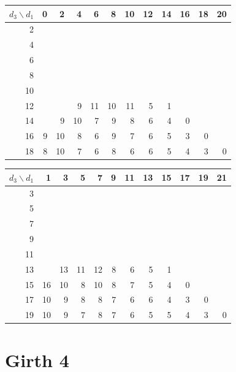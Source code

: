 \begin{tabular}{r|rrrrrrrrrrr}
\hline
$d_3 \backslash d_1$ & 0 & 2 & 4 & 6 & 8 & 10 & 12 & 14 & 16 & 18 & 20 \\
\hline
2 &  &  &  &  &  &  &  &  &  &  &  \\
4 &  &  &  &  &  &  &  &  &  &  &  \\
6 &  &  &  &  &  &  &  &  &  &  &  \\
8 &  &  &  &  &  &  &  &  &  &  &  \\
10 &  &  &  &  &  &  &  &  &  &  &  \\
12 &  &  & 9 & 11 & 10 & 11 & 5 & 1 &  &  &  \\
14 &  & 9 & 10 & 7 & 9 & 8 & 6 & 4 & 0 &  &  \\
16 & 9 & 10 & 8 & 6 & 9 & 7 & 6 & 5 & 3 & 0 &  \\
18 & 8 & 10 & 7 & 6 & 8 & 6 & 6 & 5 & 4 & 3 & 0 \\
\hline
\end{tabular}

\begin{tabular}{r|rrrrrrrrrrr}
\hline
$d_3 \backslash d_1$ & 1 & 3 & 5 & 7 & 9 & 11 & 13 & 15 & 17 & 19 & 21 \\
\hline
3 &  &  &  &  &  &  &  &  &  &  &  \\
5 &  &  &  &  &  &  &  &  &  &  &  \\
7 &  &  &  &  &  &  &  &  &  &  &  \\
9 &  &  &  &  &  &  &  &  &  &  &  \\
11 &  &  &  &  &  &  &  &  &  &  &  \\
13 &  & 13 & 11 & 12 & 8 & 6 & 5 & 1 &  &  &  \\
15 & 16 & 10 & 8 & 10 & 8 & 7 & 5 & 4 & 0 &  &  \\
17 & 10 & 9 & 8 & 8 & 7 & 6 & 6 & 4 & 3 & 0 &  \\
19 & 10 & 9 & 7 & 8 & 7 & 6 & 5 & 5 & 4 & 3 & 0 \\
\hline
\end{tabular}

\section*{Girth 4}

